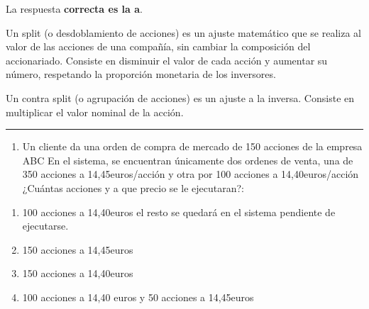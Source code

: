 \documentclass[
  letterpaper,
  DIV=11,
  numbers=noendperiod]{scrreprt}
\providecommand{\tightlist}{%
  \setlength{\itemsep}{0pt}\setlength{\parskip}{0pt}}\usepackage{longtable,booktabs,array}
\begin{document}
\begin{tcolorbox}[enhanced jigsaw, left=2mm, opacityback=0, colback=white, breakable, arc=.35mm, bottomrule=.15mm, rightrule=.15mm, toprule=.15mm, leftrule=.75mm, colframe=quarto-callout-tip-color-frame]
\begin{minipage}[t]{5.5mm}
\textcolor{quarto-callout-tip-color}{\faLightbulb}
\end{minipage}%
\begin{minipage}[t]{\textwidth - 5.5mm}

La respuesta \textbf{correcta es la a}.

Un split (o desdoblamiento de acciones) es un ajuste matemático que se
realiza al valor de las acciones de una compañía, sin cambiar la
composición del accionariado. Consiste en disminuir el valor de cada
acción y aumentar su número, respetando la proporción monetaria de los
inversores.

Un contra split (o agrupación de acciones) es un ajuste a la inversa.
Consiste en multiplicar el valor nominal de la acción.

\end{minipage}%
\end{tcolorbox}

\begin{center}\rule{0.5\linewidth}{0.5pt}\end{center}

\begin{enumerate}
\def\labelenumi{\arabic{enumi}.}
\setcounter{enumi}{28}
\tightlist
\item
  Un cliente da una orden de compra de mercado de 150 acciones de la
  empresa ABC En el sistema, se encuentran únicamente dos ordenes de
  venta, una de 350 acciones a 14,45euros/acción y otra por 100 acciones
  a 14,40euros/acción ¿Cuántas acciones y a que precio se le
  ejecutaran?:
\end{enumerate}

\begin{enumerate}
\def\labelenumi{\alph{enumi})}
\item
  100 acciones a 14,40euros el resto se quedará en el sistema pendiente
  de ejecutarse.
\item
  150 acciones a 14,45euros
\item
  150 acciones a 14,40euros
\item
  100 acciones a 14,40 euros y 50 acciones a 14,45euros
\end{enumerate}
\end{document}
